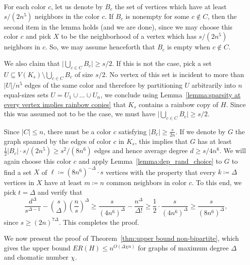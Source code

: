 \documentclass[a4paper,11pt]{article}
\makeatletter
\renewenvironment{proof}[1][\proofname] {\par\pushQED{\qed}\normalfont\topsep6\p@\@plus6\p@\relax\trivlist\item[\hskip\labelsep\bfseries#1\@addpunct{.}]\ignorespaces}{\popQED\endtrivlist\@endpefalse}
\theoremstyle{definition}
\makeatother
\begin{document}
\begin{proof}[Proof of Lemma~\ref{lemma:one_step}]
For each color $c$, let us denote by $B_c$ the set of vertices which have at least $s/(2n^5)$ neighbors in the color $c$. If $B_c$ is nonempty for some $c\notin C$, then the second item in the lemma holds (and we are done), since we may choose this color $c$ and pick $X$ to be the neighborhood of a vertex which has $s/(2n^5)$ neighbors in $c$. So, we may assume henceforth that $B_c$ is empty when $c\notin C$.

We also claim that $\Big|\bigcup_{c\in C} B_c\Big|\geq s/2$. If this is not the case, pick a set $U\subseteq V(K_s)\setminus \bigcup_{c\in C} B_c$ of size $s/2$. No vertex of this set is incident to more than $|U|/n^5$ edges of the same color and therefore by partitioning $U$ arbitrarily into $n$ equal-sizes sets $U=U_1\cup\dots\cup U_n$, we conclude using Lemma~\ref{lemma:sparsity at every vertex implies rainbow copies} that $K_s$ contains a rainbow copy of $H$. Since this was assumed not to be the case, we must have $\Big|\bigcup_{c\in C} B_c\Big|\geq s/2$.

Since $|C| \leq n$, there must be a color $c$ satisfying $|B_c|\geq \frac{s}{2n}$. If we denote by $G$ the graph spanned by the edges of color $c$ in $K_s$, this implies that $G$ has at least $\frac{1}{2}|B_c| \cdot s/(2n^5) \geq s^2/(8n^6)$ edges and hence average degree 
$d \geq s/4n^6$. 
We will again choose this color $c$ and apply Lemma~\ref{lemma:dep_rand_choice} to $G$ to find a set $X$ of $\ell\coloneqq(8n^6)^{-\Delta} \cdot s$ vertices with the property that every $k\coloneqq\Delta$ vertices in $X$ have at least $m\coloneqq n$ common neighbors in color $c$. To this end, we pick $t=\Delta$ and verify that
\[\frac{d^\Delta}{s^{\Delta-1}}-\binom{s}{\Delta}\left(\frac{n}{s}\right)^{\Delta}\geq \frac{s}{(4n^6)^\Delta} - \frac{n^{\Delta}}{\Delta!}\geq 
\frac{1}{2}\cdot \frac{s}{(4n^6)^\Delta} \geq 
\frac{s}{(8n^6)^\Delta}, \]
since $s\geq (2n)^{7\Delta}$. This completes the proof.
\end{proof}

We now present the proof of Theorem~\ref{thm:upper bound non-bipartite}, which gives the upper bound $ER(H)\leq n^{O(\Delta \chi n)}$ for graphs of maximum degree $\Delta$ and chomatic number $\chi$.
\end{document}
